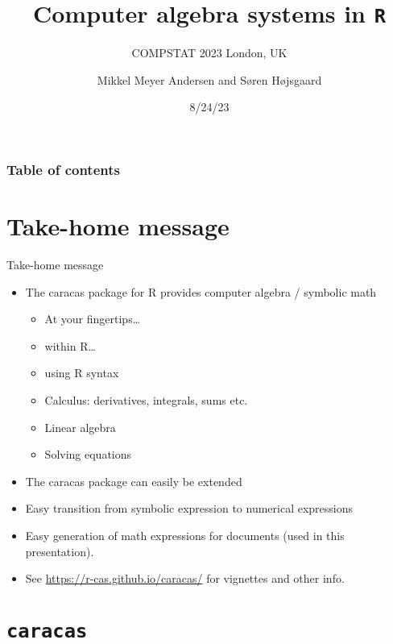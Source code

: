 \documentclass[
  ignorenonframetext,
]{beamer}
\title{Computer algebra systems in \texttt{R}}
\subtitle{COMPSTAT 2023 London, UK}
\author{Mikkel Meyer Andersen and Søren Højsgaard}
\date{8/24/23}
\providecommand{\tightlist}{%
  \setlength{\itemsep}{0pt}\setlength{\parskip}{0pt}}\usepackage{longtable,booktabs,array}
\renewcommand*\contentsname{Table of contents}
\newcommand\contentsname{Table of contents}
\begin{document}
\frame{\titlepage}
\ifdefined\Shaded\renewenvironment{Shaded}{\begin{tcolorbox}[enhanced, sharp corners, frame hidden, interior hidden, boxrule=0pt, breakable, borderline west={3pt}{0pt}{shadecolor}]}{\end{tcolorbox}}\fi

\renewcommand*\contentsname{Table of contents}
\begin{frame}[allowframebreaks]
  \frametitle{Table of contents}
  \tableofcontents[hideallsubsections]
\end{frame}
\hypertarget{take-home-message}{%
\section{Take-home message}\label{take-home-message}}

\begin{frame}{Take-home message}
\begin{itemize}
\item
  The caracas package for R provides computer algebra / symbolic math

  \begin{itemize}
  \tightlist
  \item
    At your fingertips\ldots{}
  \item
    within R\ldots{}
  \item
    using R syntax
  \item
    Calculus: derivatives, integrals, sums etc.
  \item
    Linear algebra
  \item
    Solving equations
  \end{itemize}
\item
  The caracas package can easily be extended
\item
  Easy transition from symbolic expression to numerical expressions
\item
  Easy generation of math expressions for documents (used in this
  presentation).
\item
  See \url{https://r-cas.github.io/caracas/} for vignettes and other
  info.
\end{itemize}
\end{frame}

\hypertarget{caracas}{%
\section{\texorpdfstring{\texttt{caracas}}{caracas}}\label{caracas}}
\end{document}

